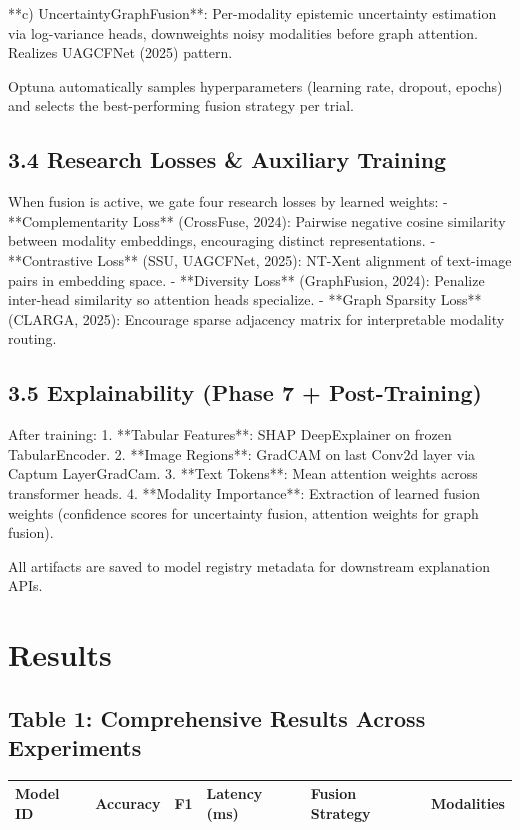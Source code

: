 \documentclass{article}
\begin{document}
**c) UncertaintyGraphFusion**: Per-modality epistemic uncertainty estimation via
   log-variance heads, downweights noisy modalities before graph attention.
   Realizes UAGCFNet (2025) pattern.

Optuna automatically samples hyperparameters (learning rate, dropout, epochs) and
selects the best-performing fusion strategy per trial.

\subsection{3.4 Research Losses & Auxiliary Training}

When fusion is active, we gate four research losses by learned weights:
- **Complementarity Loss** (CrossFuse, 2024): Pairwise negative cosine similarity
  between modality embeddings, encouraging distinct representations.
- **Contrastive Loss** (SSU, UAGCFNet, 2025): NT-Xent alignment of text-image pairs
  in embedding space.
- **Diversity Loss** (GraphFusion, 2024): Penalize inter-head similarity so attention
  heads specialize.
- **Graph Sparsity Loss** (CLARGA, 2025): Encourage sparse adjacency matrix for
  interpretable modality routing.

\subsection{3.5 Explainability (Phase 7 + Post-Training)}

After training:
1. **Tabular Features**: SHAP DeepExplainer on frozen TabularEncoder.
2. **Image Regions**: GradCAM on last Conv2d layer via Captum LayerGradCam.
3. **Text Tokens**: Mean attention weights across transformer heads.
4. **Modality Importance**: Extraction of learned fusion weights (confidence scores
   for uncertainty fusion, attention weights for graph fusion).

All artifacts are saved to model registry metadata for downstream explanation APIs.

\section{Results}

\subsection{Table 1: Comprehensive Results Across Experiments}

\begin{table}[h]
\centering
\begin{tabular}{llllll}
\toprule
Model ID & Accuracy & F1 & Latency (ms) & Fusion Strategy & Modalities \\
\midrule
\bottomrule
\end{tabular}
\end{table}
\end{document}
